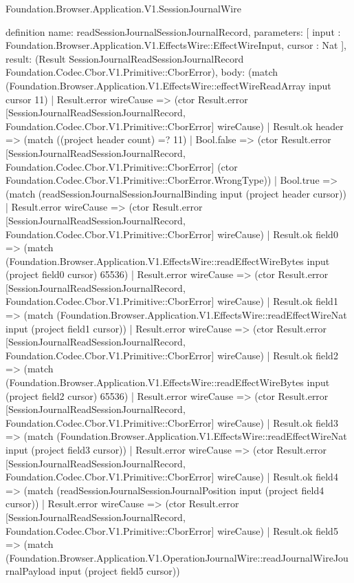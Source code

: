 \begin{lexlean}{Foundation.Browser.Application.V1.SessionJournalWire}
\begin{semanticmodule}
definition{
  name: readSessionJournalSessionJournalRecord,
  parameters: [
    input : Foundation.Browser.Application.V1.EffectsWire::EffectWireInput,
    cursor : Nat
  ],
  result: (Result SessionJournalReadSessionJournalRecord Foundation.Codec.Cbor.V1.Primitive::CborError),
  body: (match (Foundation.Browser.Application.V1.EffectsWire::effectWireReadArray input cursor 11)
    | Result.error wireCause => (ctor Result.error [SessionJournalReadSessionJournalRecord, Foundation.Codec.Cbor.V1.Primitive::CborError] wireCause)
    | Result.ok header => (match ((project header count) =? 11)
      | Bool.false => (ctor Result.error [SessionJournalReadSessionJournalRecord, Foundation.Codec.Cbor.V1.Primitive::CborError] (ctor Foundation.Codec.Cbor.V1.Primitive::CborError.WrongType))
      | Bool.true => (match (readSessionJournalSessionJournalBinding input (project header cursor))
        | Result.error wireCause => (ctor Result.error [SessionJournalReadSessionJournalRecord, Foundation.Codec.Cbor.V1.Primitive::CborError] wireCause)
        | Result.ok field0 => (match (Foundation.Browser.Application.V1.EffectsWire::readEffectWireBytes input (project field0 cursor) 65536)
          | Result.error wireCause => (ctor Result.error [SessionJournalReadSessionJournalRecord, Foundation.Codec.Cbor.V1.Primitive::CborError] wireCause)
          | Result.ok field1 => (match (Foundation.Browser.Application.V1.EffectsWire::readEffectWireNat input (project field1 cursor))
            | Result.error wireCause => (ctor Result.error [SessionJournalReadSessionJournalRecord, Foundation.Codec.Cbor.V1.Primitive::CborError] wireCause)
            | Result.ok field2 => (match (Foundation.Browser.Application.V1.EffectsWire::readEffectWireBytes input (project field2 cursor) 65536)
              | Result.error wireCause => (ctor Result.error [SessionJournalReadSessionJournalRecord, Foundation.Codec.Cbor.V1.Primitive::CborError] wireCause)
              | Result.ok field3 => (match (Foundation.Browser.Application.V1.EffectsWire::readEffectWireNat input (project field3 cursor))
                | Result.error wireCause => (ctor Result.error [SessionJournalReadSessionJournalRecord, Foundation.Codec.Cbor.V1.Primitive::CborError] wireCause)
                | Result.ok field4 => (match (readSessionJournalSessionJournalPosition input (project field4 cursor))
                  | Result.error wireCause => (ctor Result.error [SessionJournalReadSessionJournalRecord, Foundation.Codec.Cbor.V1.Primitive::CborError] wireCause)
                  | Result.ok field5 => (match (Foundation.Browser.Application.V1.OperationJournalWire::readJournalWireJournalPayload input (project field5 cursor))
}
\end{semanticmodule}
\end{lexlean}
